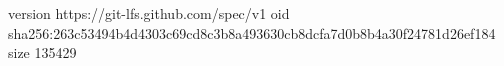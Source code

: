 version https://git-lfs.github.com/spec/v1
oid sha256:263c53494b4d4303c69cd8c3b8a493630cb8dcfa7d0b8b4a30f24781d26ef184
size 135429
